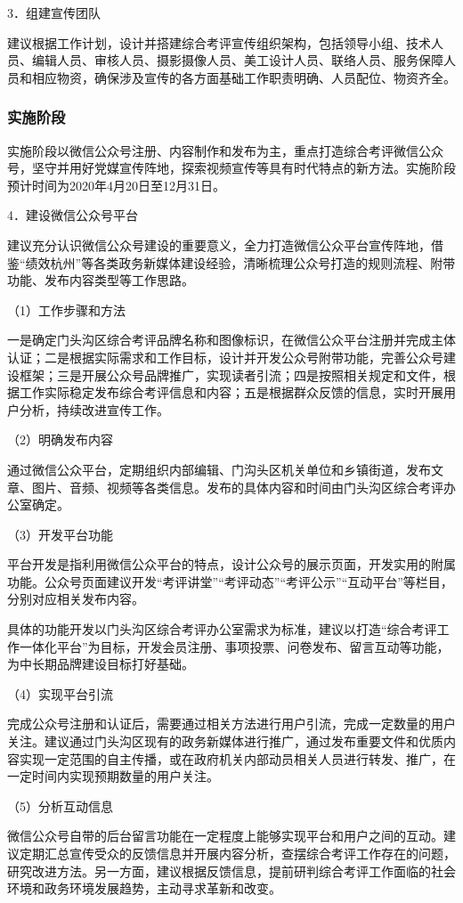 \documentclass[12pt]{article} %
\begin{document}
3．组建宣传团队

建议根据工作计划，设计并搭建综合考评宣传组织架构，包括领导小组、技术人员、编辑人员、审核人员、摄影摄像人员、美工设计人员、联络人员、服务保障人员和相应物资，确保涉及宣传的各方面基础工作职责明确、人员配位、物资齐全。

\subsubsection{实施阶段}

实施阶段以微信公众号注册、内容制作和发布为主，重点打造综合考评微信公众号，坚守并用好党媒宣传阵地，探索视频宣传等具有时代特点的新方法。实施阶段预计时间为2020年4月20日至12月31日。

4．建设微信公众号平台

建议充分认识微信公众号建设的重要意义，全力打造微信公众平台宣传阵地，借鉴“绩效杭州”等各类政务新媒体建设经验，清晰梳理公众号打造的规则流程、附带功能、发布内容类型等工作思路。

（1）工作步骤和方法

一是确定门头沟区综合考评品牌名称和图像标识，在微信公众平台注册并完成主体认证；二是根据实际需求和工作目标，设计并开发公众号附带功能，完善公众号建设框架；三是开展公众号品牌推广，实现读者引流；四是按照相关规定和文件，根据工作实际稳定发布综合考评信息和内容；五是根据群众反馈的信息，实时开展用户分析，持续改进宣传工作。

（2）明确发布内容

通过微信公众平台，定期组织内部编辑、门沟头区机关单位和乡镇街道，发布文章、图片、音频、视频等各类信息。发布的具体内容和时间由门头沟区综合考评办公室确定。

（3）开发平台功能

平台开发是指利用微信公众平台的特点，设计公众号的展示页面，开发实用的附属功能。公众号页面建议开发“考评讲堂”“考评动态”“考评公示”“互动平台”等栏目，分别对应相关发布内容。

具体的功能开发以门头沟区综合考评办公室需求为标准，建议以打造“综合考评工作一体化平台”为目标，开发会员注册、事项投票、问卷发布、留言互动等功能，为中长期品牌建设目标打好基础。

（4）实现平台引流

完成公众号注册和认证后，需要通过相关方法进行用户引流，完成一定数量的用户关注。建议通过门头沟区现有的政务新媒体进行推广，通过发布重要文件和优质内容实现一定范围的自主传播，或在政府机关内部动员相关人员进行转发、推广，在一定时间内实现预期数量的用户关注。

（5）分析互动信息

微信公众号自带的后台留言功能在一定程度上能够实现平台和用户之间的互动。建议定期汇总宣传受众的反馈信息并开展内容分析，查摆综合考评工作存在的问题，研究改进方法。另一方面，建议根据反馈信息，提前研判综合考评工作面临的社会环境和政务环境发展趋势，主动寻求革新和改变。
\end{document}
